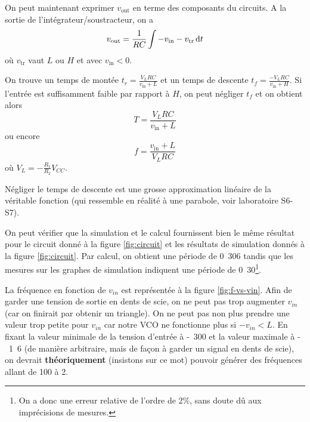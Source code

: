 On peut maintenant exprimer $v_{\text{out}}$ en terme
des composants du circuits. A la sortie de l'intégrateur/soustracteur,
on a
\begin{equation}
	v_{\text{out}} = \frac{1}{RC} \int -v_{\text{in}} - v_{\text{tr}} \operatorname{d}\! t 
	\label{eq:eq-circ}
\end{equation}
où $v_{\text{tr}}$ vaut $L$ ou $H$ et avec $v_{\text{in}} < 0$.

On trouve un temps de montée $t_r = \frac{V_LRC}{v_{\text{in}} + L}$
et un temps de descente $t_f = \frac{-V_LRC}{v_{\text{in}} + H}$.
Si l'entrée est suffisamment faible par rapport à $H$, on
peut négliger $t_f$ et on obtient alors
\[ T = \frac{V_LRC}{v_{\text{in}} + L} \]
ou encore
\[ f = \frac{v_{\text{in}} + L}{V_LRC} \]
où $V_L = -\frac{R_1}{R_2}V_{CC}$.

\begin{correction}
	Négliger le temps de descente est une grosse approximation
	linéaire de la véritable fonction (qui ressemble en réalité
	à une parabole, voir laboratoire S6-S7).
\end{correction}

On peut vérifier que la simulation et le calcul fournissent
bien le même résultat pour le circuit donné à la figure \ref{fig:circuit}
et les résultats de simulation donnés à la figure \ref{fig:circuit}.
Par calcul, on obtient une période de \unit{0.306}{\milli\second}
tandis que les mesures sur les graphes de simulation indiquent
une période de \unit{0.30}{\milli\second}\footnote{On a donc une
erreur relative de l'ordre de 2\%, sans doute dû aux imprécisions
de mesures.}.

La fréquence en fonction de $v_{in}$ est représentée à la figure
\ref{fig:f-vs-vin}. Afin de garder une tension de sortie
en dents de scie, on ne peut pas trop augmenter $v_{in}$ (car
on finirait par obtenir un triangle). On ne peut pas non
plus prendre une valeur trop petite pour $v_{in}$ car notre
VCO ne fonctionne plus si $-v_{in} < L$. En fixant
la valeur minimale de la tension d'entrée à \unit{-300}{\milli\volt} et la valeur
maximale à \unit{-1.6}{\volt} (de manière arbitraire, mais
de façon à garder un signal en dents de scie), on devrait
\textbf{théoriquement} (insistons sur ce mot) pouvoir générer 
des fréquences allant de \unit{100}{\hertz} à \unit{2}{\kilo\hertz}.


